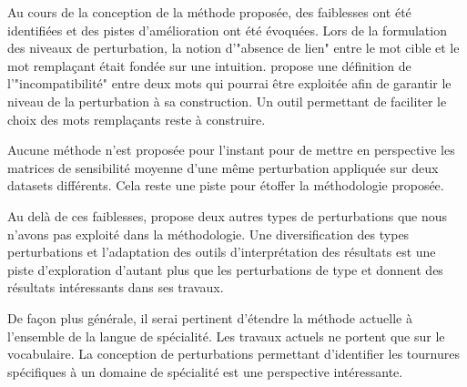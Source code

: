     Au cours de la conception de la méthode proposée, des faiblesses ont été identifiées et des pistes d'amélioration ont été évoquées.
    Lors de la formulation des niveaux de perturbation, la notion d'"absence de lien" entre le mot cible et le mot remplaçant était fondée sur une intuition. \cite{greimas_semiotique_1979} propose une définition de l'"incompatibilité" entre deux mots qui pourrai être exploitée afin de garantir le niveau de la perturbation à sa construction. Un outil permettant de faciliter le choix des mots remplaçants reste à construire.

    Aucune méthode n'est proposée pour l'instant pour de mettre en perspective les matrices de sensibilité moyenne d'une même perturbation appliquée sur deux datasets différents. Cela reste une piste pour étoffer la méthodologie proposée.

    Au delà de ces faiblesses, \cite{parry_mechir_2025} propose deux autres types de perturbations que nous n'avons pas exploité dans la méthodologie. Une diversification des types perturbations et l'adaptation des outils d'interprétation des résultats est une piste d'exploration d'autant plus que les perturbations de type \prepend et \append donnent des résultats intéressants dans ses travaux.

    De façon plus générale, il serai pertinent d'étendre la méthode actuelle à l'ensemble de la langue de spécialité. Les travaux actuels ne portent que sur le vocabulaire. La conception de perturbations permettant d'identifier les tournures spécifiques à un domaine de spécialité est une perspective intéressante.
